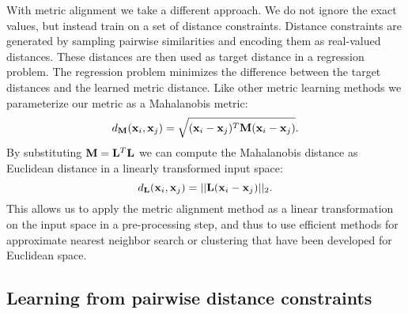 With metric alignment we take a different approach. We do not ignore the exact values, but instead train on a set of distance constraints. Distance constraints are generated by sampling pairwise similarities and encoding them as real-valued distances. These distances are then used as target distance in a regression problem. The regression problem minimizes the difference between the target distances and the learned metric distance. Like other metric learning methods we parameterize our metric as a Mahalanobis metric:  
\begin{equation}
d_{\mathbf{M}}(\mathbf{x}_i, \mathbf{x}_j) = \sqrt{(\mathbf{x}_i-\mathbf{x}_j)^T \mathbf{M} (\mathbf{x}_i - \mathbf{x}_j)}.
\label{eq:mahalanobis}
\end{equation}
By substituting $\mathbf{M} = \mathbf{L}^T \mathbf{L}$ we can compute the Mahalanobis distance as Euclidean distance in a linearly transformed input space:
\begin{equation}
d_{\mathbf{L}}(\mathbf{x}_i, \mathbf{x}_j) =  ||\mathbf{L} (\mathbf{x}_i - \mathbf{x}_j)||_2.
\label{eq:mahalanobis_transformation}
\end{equation}
This allows us to apply the metric alignment method as a linear transformation on the input space in a pre-processing step, and thus to use efficient methods for approximate nearest neighbor search or clustering that have been developed for Euclidean space. %


\subsection{Learning from pairwise distance constraints}


